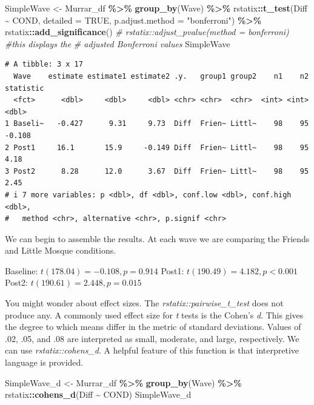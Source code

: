 \documentclass[
  11pt,
]{book}
\newenvironment{Shaded}{\begin{snugshade}}{\end{snugshade}}
\newcommand{\AttributeTok}[1]{\textcolor[rgb]{0.27,0.27,0.27}{#1}}
\newcommand{\CommentTok}[1]{\textcolor[rgb]{0.37,0.37,0.37}{\textit{#1}}}
\newcommand{\ConstantTok}[1]{\textcolor[rgb]{0.37,0.37,0.37}{#1}}
\newcommand{\FunctionTok}[1]{\textcolor[rgb]{0.27,0.27,0.27}{\textbf{#1}}}
\newcommand{\NormalTok}[1]{#1}
\newcommand{\OtherTok}[1]{\textcolor[rgb]{0.37,0.37,0.37}{#1}}
\newcommand{\SpecialCharTok}[1]{\textcolor[rgb]{0.43,0.43,0.43}{\textbf{#1}}}
\newcommand{\StringTok}[1]{\textcolor[rgb]{0.5,0.5,0.5}{#1}}
\begin{document}
\begin{Shaded}
\begin{Highlighting}[]
\NormalTok{SimpleWave }\OtherTok{\textless{}{-}}\NormalTok{ Murrar\_df }\SpecialCharTok{\%\textgreater{}\%}
    \FunctionTok{group\_by}\NormalTok{(Wave) }\SpecialCharTok{\%\textgreater{}\%}
\NormalTok{    rstatix}\SpecialCharTok{::}\FunctionTok{t\_test}\NormalTok{(Diff }\SpecialCharTok{\textasciitilde{}}\NormalTok{ COND, }\AttributeTok{detailed =} \ConstantTok{TRUE}\NormalTok{, }\AttributeTok{p.adjust.method =} \StringTok{"bonferroni"}\NormalTok{) }\SpecialCharTok{\%\textgreater{}\%}
\NormalTok{    rstatix}\SpecialCharTok{::}\FunctionTok{add\_significance}\NormalTok{()}
\CommentTok{\# rstatix::adjust\_pvalue(method = \textquotesingle{}bonferroni\textquotesingle{}) \#this displays the}
\CommentTok{\# adjusted Bonferroni values}
\NormalTok{SimpleWave}
\end{Highlighting}
\end{Shaded}

\begin{verbatim}
# A tibble: 3 x 17
  Wave    estimate estimate1 estimate2 .y.   group1 group2    n1    n2 statistic
  <fct>      <dbl>     <dbl>     <dbl> <chr> <chr>  <chr>  <int> <int>     <dbl>
1 Baseli~   -0.427      9.31     9.73  Diff  Frien~ Littl~    98    95    -0.108
2 Post1     16.1       15.9     -0.149 Diff  Frien~ Littl~    98    95     4.18 
3 Post2      8.28      12.0      3.67  Diff  Frien~ Littl~    98    95     2.45 
# i 7 more variables: p <dbl>, df <dbl>, conf.low <dbl>, conf.high <dbl>,
#   method <chr>, alternative <chr>, p.signif <chr>
\end{verbatim}

We can begin to assemble the results. At each wave we are comparing the Friends and Little Mosque conditions.

Baseline: \(t(178.04) = -0.108, p = 0.914\) Post1: \(t(190.49) = 4.182, p < 0.001\) Post2: \(t(190.61) = 2.448, p = 0.015\)

You might wonder about effect sizes. The \emph{rstatix::pairwise\_t\_test} does not produce any. A commonly used effect size for \emph{t} tests is the Cohen's \emph{d}. This gives the degree to which means differ in the metric of standard deviations. Values of .02, .05, and .08 are interpreted as small, moderate, and large, respectively. We can use \emph{rstatix::cohens\_d}. A helpful feature of this function is that interpretive language is provided.

\begin{Shaded}
\begin{Highlighting}[]
\NormalTok{SimpleWave\_d }\OtherTok{\textless{}{-}}\NormalTok{ Murrar\_df }\SpecialCharTok{\%\textgreater{}\%}
    \FunctionTok{group\_by}\NormalTok{(Wave) }\SpecialCharTok{\%\textgreater{}\%}
\NormalTok{    rstatix}\SpecialCharTok{::}\FunctionTok{cohens\_d}\NormalTok{(Diff }\SpecialCharTok{\textasciitilde{}}\NormalTok{ COND)}
\NormalTok{SimpleWave\_d}
\end{Highlighting}
\end{Shaded}
\end{document}
